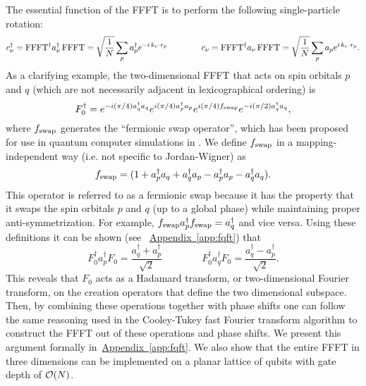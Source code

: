 \documentclass[superscriptaddress,aps,pra,nofootinbib,notitlepage,10pt,longbibliography]{revtex4-1}
\DeclareRobustCommand{\app}[1]{\hyperref[app:#1]{Appendix~\ref*{app:#1}}}
\begin{document}
The essential function of the FFFT is to perform the following single-particle rotation:
\begin{equation}
c^\dagger_\nu = {\rm FFFT}^\dagger a^\dagger_\nu \, {\rm FFFT} =  \sqrt{\frac{1}{N}}  \sum_{p} a^\dagger_{p} e^{- i \,k_\nu \cdot r_p}
\quad \quad \quad \quad
c_\nu ={\rm FFFT}^\dagger a_\nu \, {\rm FFFT} =  \sqrt{\frac{1}{N}}  \sum_{p} a_{p} e^{i \,k_\nu \cdot r_p}.
\end{equation}
As a clarifying example, the two-dimensional {\rm FFFT} that acts on spin orbitals $p$ and $q$ (which are not necessarily adjacent in lexicographical ordering) is 
\begin{equation}
F_0^\dagger = e^{-i(\pi/4)a_q^\dagger a_q} e^{i(\pi/4)a_p^\dagger a_p} e^{i(\pi/4)f_{\rm swap}}e^{-i(\pi/2) a_q^\dagger a_q},\label{eq:f2def}
\end{equation}
where $f_{\rm swap}$ generates the ``fermionic swap operator'', which has been proposed for use in quantum computer simulations
in \cite{Wecker2015a}. We define $f_{\rm swap}$ in a mapping-independent way (i.e. not specific to Jordan-Wigner) as
\begin{equation}
\label{eq:fswap}
f_{\rm swap}= (1+a_p^\dagger a_q +a_q^\dagger a_p -a_p^\dagger a_p -a_q^\dagger a_q ).
\end{equation}
This operator is referred to as a fermionic swap because it has the property that it swaps the spin orbitals $p$ and $q$ (up to a global phase) while maintaining proper anti-symmetrization.  For example, $f_{\rm swap} a_p^\dagger f_{\rm swap} = a_q^\dagger$ and vice versa.  Using these definitions it can be shown (see ~\app{fqft}) that
\begin{equation}
F_0^\dagger a_p^\dagger F_0 = \frac{a_q^\dagger + a_p^\dagger}{\sqrt{2}}
\quad \quad \quad \quad
F_0^\dagger a_q^\dagger F_0 = \frac{a_q^\dagger - a_p^\dagger}{\sqrt{2}}.
\end{equation}
This reveals that $F_0$ acts as a Hadamard transform, or two-dimensional Fourier transform, on the creation operators that define the two dimensional subspace.  Then, by combining these operations together with phase shifts one can follow the same reasoning used in the Cooley-Tukey fast Fourier transform algorithm \cite{Cooley1965} to construct the FFFT out of these operations and phase shifts.  We present this argument formally in~\app{fqft}. We also show that the entire FFFT in three dimensions can be implemented on a planar lattice of qubits with gate depth of ${\cal O}(N)$.
\end{document}
